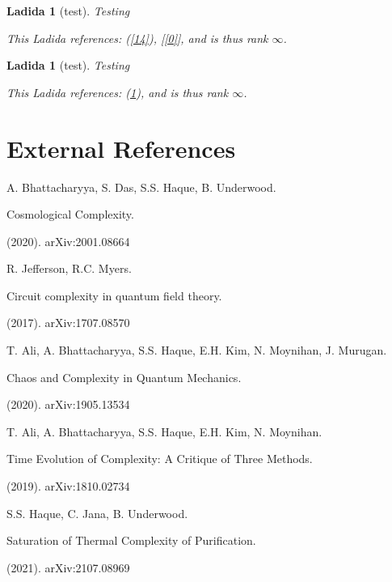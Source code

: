 \documentclass{article}
\newtheorem{Ladida}[definition]{Ladida}
\begin{document}
\begin{tcolorbox}[title=Ladida: test]\begin{Ladida}[test]\label{15}Testing
 
 This Ladida references: (\ref{14}), [\ref{0}], and is thus rank $\infty$.\end{Ladida}\end{tcolorbox}
\begin{tcolorbox}[title=Ladida: test]\begin{Ladida}[test]\label{16}Testing
 
 This Ladida references: (\ref{15}), and is thus rank $\infty$.\end{Ladida}\end{tcolorbox}
\section*{External References}
\begin{enumerate}[label={[\arabic*]}]\item A. Bhattacharyya, S. Das, S.S. Haque, B. Underwood. \begin{textit}Cosmological Complexity. \end{textit}(2020). arXiv:2001.08664
\item R. Jefferson, R.C. Myers. \begin{textit}Circuit complexity in quantum field theory. \end{textit}(2017). arXiv:1707.08570
\item T. Ali, A. Bhattacharyya, S.S. Haque, E.H. Kim, N. Moynihan, J. Murugan. \begin{textit}Chaos and Complexity in Quantum Mechanics. \end{textit}(2020). arXiv:1905.13534
\item T. Ali, A. Bhattacharyya, S.S. Haque, E.H. Kim, N. Moynihan. \begin{textit}Time Evolution of Complexity: A Critique of Three Methods. \end{textit}(2019). arXiv:1810.02734
\item S.S. Haque, C. Jana, B. Underwood. \begin{textit}Saturation of Thermal Complexity of Purification. \end{textit}(2021). arXiv:2107.08969
\end{enumerate}
\end{document}
